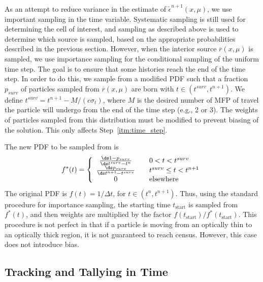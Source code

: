 As an attempt to reduce variance in the estimate of $\tilde \epsilon^{n+1}(x,\mu)$, we use
important sampling in the time variable.  Systematic sampling is still used for
determining the cell of interest, and sampling as described above is used to determine
which source is sampled, based on the appropriate probabilities described in the previous
section.  However, when the interior source $\overline r(x,\mu)$ is sampled, we use
importance sampling for the conditional sampling of the uniform time step.  The goal is to ensure that some
histories reach the end of the time step.  In order to do this, we sample from a modified
PDF such that a fraction $p_{surv}$ of particles sampled from $\overline r(x,\mu)$ are born
with $t\in(t^{surv},t^{n+1})$.  We define $t^{surv}=t^{n+1}-M/(c\sigma_t)$, where $M$ is the desired
number of MFP of travel the particle will undergo from the end of
the time step (e.g., 2 or 3).  The weights of particles sampled from this
distribution must be modified to prevent biasing of the solution.  This only affects
Step~\ref{itm:time_step}.

The new PDF to be sampled from is
\begin{equation}
    f^*(t) = \left\{ \begin{array}{cl}
        \frac{\ds 1 - p_{surv}}{\ds t^{surv} - t^n} &\quad 0 < t < t^{surv} \\ 
        \frac{\ds p_{surv}}{\ds t^{n+1} - t^{surv}} & \quad t^{surv} \leq t < t^{n+1}  \\
        0 & \quad \text{elsewhere}\end{array}  \right.
\end{equation}
The original PDF is $f(t)= 1/\Delta t$, for $t\in(t^{n},t^{n+1})$.  Thus, using the
standard procedure for importance sampling\cite{shultis_mc}, the starting time $t_{\text{start}}$ is sampled from
$f^*(t)$, and then weights are multiplied by the factor
$f(t_{\text{start}})/f^*(t_{\text{start}})$.  This procedure is not perfect in that if a
particle is moving from an optically thin to an optically thick
region, it is not guaranteed to reach census. However, this case does not introduce bias.

\subsection{Tracking and Tallying in Time}

